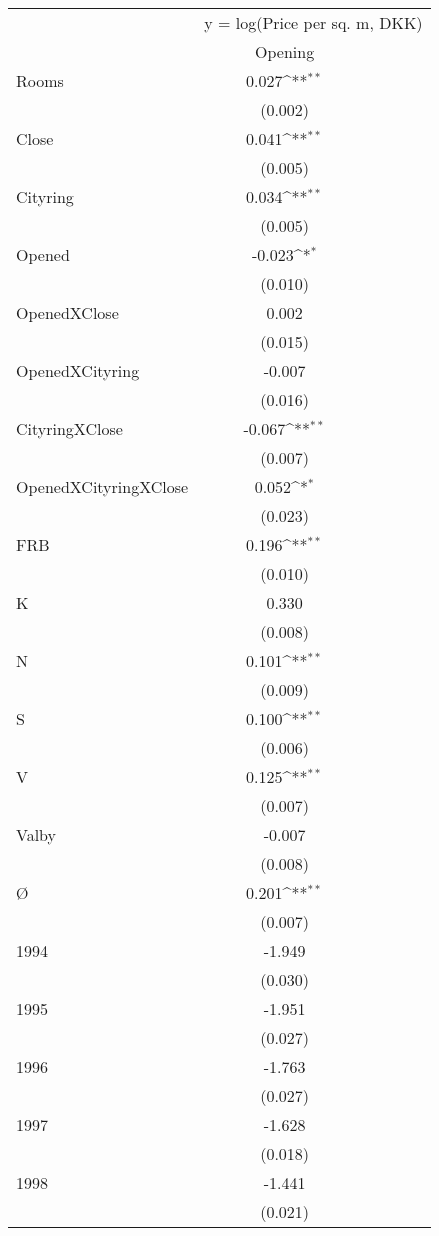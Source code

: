   {
\def\sym#1{\ifmmode^{#1}\else\(^{#1}\)\fi}
\begin{tabular}{@{\extracolsep{2pt}}l*{1}{c}@{}}
\hline\hline
& \multicolumn{3}{c}{y = log(Price per sq. m, DKK)} \\
\cline{2-4}
 & Opening \\
\hline
Rooms & 0.027\sym{**} \\
 & (0.002) \\
Close & 0.041\sym{**} \\
 & (0.005) \\
Cityring & 0.034\sym{**} \\
 & (0.005) \\
Opened & -0.023\sym{*} \\
 & (0.010) \\
OpenedXClose & 0.002 \\
 & (0.015) \\
OpenedXCityring & -0.007 \\
 & (0.016) \\
CityringXClose & -0.067\sym{**} \\
 & (0.007) \\
OpenedXCityringXClose & 0.052\sym{*} \\
 & (0.023) \\
FRB & 0.196\sym{**} \\
 & (0.010) \\
K & 0.330 \\
 & (0.008) \\
N & 0.101\sym{**} \\
 & (0.009) \\
S & 0.100\sym{**} \\
 & (0.006) \\
V & 0.125\sym{**} \\
 & (0.007) \\
Valby & -0.007 \\
 & (0.008) \\
Ø & 0.201\sym{**} \\
 & (0.007) \\
1994 & -1.949 \\
 & (0.030) \\
1995 & -1.951 \\
 & (0.027) \\
1996 & -1.763 \\
 & (0.027) \\
1997 & -1.628 \\
 & (0.018) \\
1998 & -1.441 \\
 & (0.021) \\

\end{tabular}}
